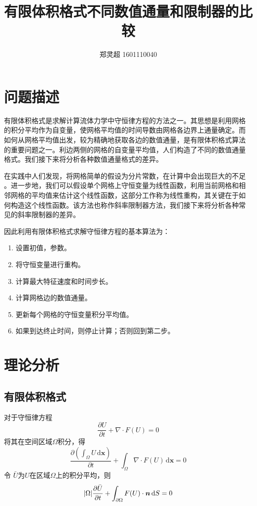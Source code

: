 \documentclass[a4paper,  11pt]{ctexart}
\newcommand\bx{\boldsymbol{x}}
\newcommand\dd{\,\mathrm{d}}
\newcommand\pd[2]{\dfrac{\partial {#1}}{\partial {#2}}}
\newcommand{\bm}[1]{\mbox{\boldmath{$#1$}}}
\begin{document}
\title{有限体积格式不同数值通量和限制器的比较}
\author{郑灵超 1601110040}
\maketitle
\section{问题描述}
有限体积格式是求解计算流体力学中守恒律方程的方法之一。其思想是利用网格
的积分平均作为自变量，使网格平均值的时间导数由网格各边界上通量确定。而
如何从网格平均值出发，较为精确地获取各边的数值通量，是有限体积格式算法
的重要问题之一。利边两侧的网格的自变量平均值，人们构造了不同的数值通量
格式。我们接下来将分析各种数值通量格式的差异。

在实践中人们发现，将网格简单的假设为分片常数，在计算中会出现巨大的不足
。进一步地，我们可以假设单个网格上守恒变量为线性函数，利用当前网格和相
邻网格的平均值来估计这个线性函数，这部分工作称为线性重构，其关键在于如
何构造这个线性函数。该方法也称作斜率限制器方法，我们接下来将分析各种常
见的斜率限制器的差异。

因此利用有限体积格式求解守恒律方程的基本算法为：
\begin{enumerate}
  \item 设置初值，参数。
  \item 将守恒变量进行重构。
  \item 计算最大特征速度和时间步长。
  \item 计算网格边的数值通量。
  \item 更新每个网格的守恒变量积分平均值。
  \item 如果到达终止时间，则停止计算；否则回到第二步。
\end{enumerate}

\section{理论分析}
\subsection{有限体积格式} 
对于守恒律方程 
\begin{equation}
  \label{eq:ConservationLaws}
  \pd{U}{t}+\nabla \cdot F(U) = 0
\end{equation}  
将其在空间区域$\Omega$积分，得
\[  
\pd{(\int_{\Omega}U\dd\bx)}{t} + \int_{\Omega} \nabla \cdot F(U)\dd\bx = 0
\]
令 $\bar{U}$为$U$在区域$\Omega$上的积分平均，则
\[  
    |\Omega|\pd{\bar{U}}{t} + \int_{\partial\Omega} F(U)\cdot \bm{n}
    \dd S = 0
\]
\end{document}
